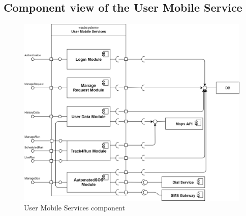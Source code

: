 \subsection{Component view of the User Mobile Service}

\begin{figure}[H]
    \centering
    \includegraphics[scale=0.2]{./Pictures/userServicesDiagram.png}
    \caption{User Mobile Services component}
\end{figure}


